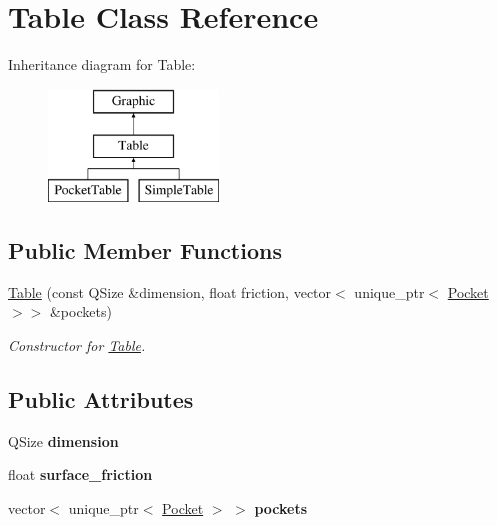 \hypertarget{class_table}{}\section{Table Class Reference}
\label{class_table}
Inheritance diagram for Table\+:\begin{figure}[H]
\begin{center}
\leavevmode
\includegraphics[height=3.000000cm]{class_table}
\end{center}
\end{figure}
\subsection*{Public Member Functions}
\begin{DoxyCompactItemize}
\item 
\mbox{\hyperlink{class_table_aa12fd8e1655bfdf20ba5bfbe7e6c9b0f}{Table}} (const Q\+Size \&dimension, float friction, vector$<$ unique\+\_\+ptr$<$ \mbox{\hyperlink{class_pocket}{Pocket}} $>$$>$ \&pockets)
\begin{DoxyCompactList}\small\item\em Constructor for \mbox{\hyperlink{class_table}{Table}}. \end{DoxyCompactList}\end{DoxyCompactItemize}
\subsection*{Public Attributes}
\begin{DoxyCompactItemize}
\item 
\mbox{\label{class_table_a7b1a7786abc4b144d7f2e6c1a82fff21}} 
Q\+Size {\bfseries dimension}
\item 
\mbox{\label{class_table_ad14cbe09cafee32b3fb47df06827c91e}} 
float {\bfseries surface\+\_\+friction}
\item 
\mbox{\label{class_table_abd8df756961b9e74d8986e5c50cdfd4e}} 
vector$<$ unique\+\_\+ptr$<$ \mbox{\hyperlink{class_pocket}{Pocket}} $>$ $>$ {\bfseries pockets}
\end{DoxyCompactItemize}


